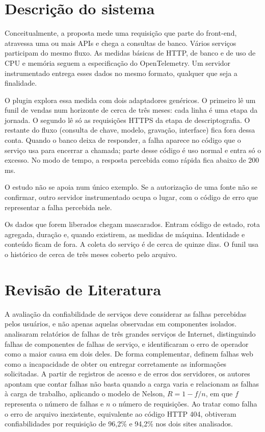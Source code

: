 \documentclass[10pt, twocolumn, a4paper]{article}
\begin{document}
\section{Descrição do sistema}

Conceitualmente, a proposta mede uma requisição que parte do front-end, atravessa uma ou mais APIs e chega a consultas de banco. Vários serviços participam do mesmo fluxo. As medidas básicas de HTTP, de banco e de uso de CPU e memória seguem a especificação do OpenTelemetry. Um servidor instrumentado entrega esses dados no mesmo formato, qualquer que seja a finalidade.

O plugin explora essa medida com dois adaptadores genéricos. O primeiro lê um funil de vendas num horizonte de cerca de três meses: cada linha é uma etapa da jornada. O segundo lê só as requisições HTTPS da etapa de descriptografia. O restante do fluxo (consulta de chave, modelo, gravação, interface) fica fora dessa conta. Quando o banco deixa de responder, a falha aparece no código que o serviço usa para encerrar a chamada; parte desse código é uso normal e entra só o excesso. No modo de tempo, a resposta percebida como rápida fica abaixo de 200 ms.

O estudo não se apoia num único exemplo. Se a autorização de uma fonte não se confirmar, outro servidor instrumentado ocupa o lugar, com o código de erro que representar a falha percebida nele.

Os dados que forem liberados chegam mascarados. Entram código de estado, rota agregada, duração e, quando existirem, as medidas de máquina. Identidade e conteúdo ficam de fora. A coleta do serviço é de cerca de quinze dias. O funil usa o histórico de cerca de três meses coberto pelo arquivo.

\section{Revisão de Literatura}

A avaliação da confiabilidade de serviços deve considerar as falhas percebidas pelos usuários, e não apenas aquelas observadas em componentes isolados.  analisaram relatórios de falhas de três grandes serviços de Internet, distinguindo falhas de componentes de falhas de serviço, e identificaram o erro de operador como a maior causa em dois deles. De forma complementar,  definem falhas web como a incapacidade de obter ou entregar corretamente as informações solicitadas. A partir de registros de acesso e de erros dos servidores, os autores apontam que contar falhas não basta quando a carga varia e relacionam as falhas à carga de trabalho, aplicando o modelo de Nelson, \(R=1-f/n\), em que \(f\) representa o número de falhas e \(n\) o número de requisições. Ao tratar como falha o erro de arquivo inexistente, equivalente ao código HTTP 404, obtiveram confiabilidades por requisição de 96,2\% e 94,2\% nos dois sites analisados.
\end{document}

